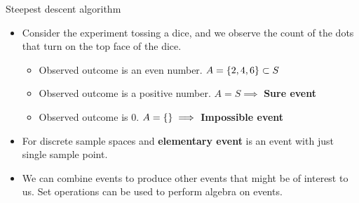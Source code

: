 \documentclass[aspectratio=169]{beamer}
\let\olditem\item
\renewcommand{\item}{\setlength{\itemsep}{\fill}\olditem}
\def\lp{\ensuremath\left(}
\def\rp{\ensuremath\right)}
\def\lc{\ensuremath\left\{}
\def\rc{\ensuremath\right\}}
\newcommand{\ct}[1]{\lp #1\rp}
\begin{document}
\begin{frame}[t]{Steepest descent algorithm}
\begin{itemize}
  \item Consider the experiment tossing a dice, and we observe the count of the dots that turn on the top face of the dice.
  \begin{itemize}
    \item Observed outcome is an even number. $A = \lc 2, 4, 6\rc \subset S$
    \item Observed outcome is a positive number. $A = S \implies $ \textbf{Sure event}
    \item Observed outcome is 0. $A = \lc\rc \implies $ \textbf{Impossible event}
  \end{itemize}
  
  \item For discrete sample spaces and \textbf{elementary event} is an event with just single sample point.
  
  \item We can combine events to produce other events that might be of interest to us. Set operations can be used to perform algebra on events.
\end{itemize}
\end{frame}


  
\end{document}
